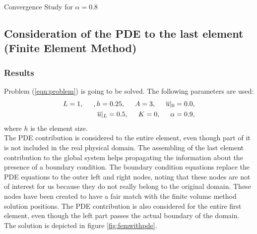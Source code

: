 \documentclass[a4paper,12pt]{article}
\makeatletter
\newenvironment{figurehere}
  {\def\@captype{figure}}
  {}
\makeatother
\begin{document}
\begin{center}
\begin{figurehere}
\caption{Convergence Study for $\alpha = 0.8$}\label{fig:convgcutPC2}
\end{figurehere}
\end{center}
\subsection{Consideration of the PDE to the last element (Finite Element Method)}
\subsubsection{Results}
Problem (\ref{eqn:problem}) is going to be solved. The following parameters are used:
\begin{eqnarray}
L = 1, \hspace{0.5cm}, h = 0.25, \hspace{0.5cm}A= 3, \hspace{0.5cm}\overline{u}\vert_0 = 0.0,\\ 
\overline{u}\vert_L=0.5, \hspace{0.5cm}K = 0,\hspace{0.5cm}\alpha = 0.9,
\end{eqnarray}
where $h$ is the element size.\\
The PDE contribution is considered to the entire element, even though part of it is not included in the real physical domain. The assembling of the last element contribution to the global system helps propagating the information about the presence of a boundary condition. The boundary condition equations replace the PDE equations to the outer left and right nodes, noting that these nodes are not of interest for us because they do not really belong to the original domain. These nodes have been created to have a fair match with the finite volume method solution positions. The PDE contribution is also considered for the entire first element, even though the left part passes the actual boundary of the domain.\\ 
The solution is depicted in figure \ref{fig:femwithpde}.
\end{document}

